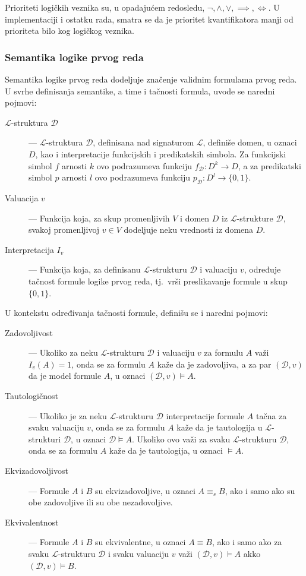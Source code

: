 \documentclass[a4paper,10pt]{article}
\begin{document}
Prioriteti logičkih veznika su, u opadajućem redosledu, $\lnot, \land, \lor, \implies, \iff$. U implementaciji i ostatku rada, smatra se da je prioritet kvantifikatora manji od prioriteta bilo kog logičkog veznika.

\subsubsection{Semantika logike prvog reda}

Semantika logike prvog reda dodeljuje značenje validnim formulama prvog reda. U svrhe definisanja semantike, a time i tačnosti formula, uvode se naredni pojmovi:

\begin{description}
    \item[$\mathcal{L}$-struktura $\mathcal{D}$] --- $\mathcal{L}$-struktura $\mathcal{D}$, definisana nad signaturom $\mathcal{L}$, definiše domen, u oznaci $D$, kao i interpretacije funkcijskih i predikatskih simbola. Za funkcijski simbol $f$ arnosti $k$ ovo podrazumeva funkciju $f_\mathcal{D}:D^k \rightarrow D$, a za predikatski simbol $p$ arnosti $l$ ovo podrazumeva funkciju $p_\mathcal{D}: D^l \rightarrow \{0, 1\}$.
    \item[Valuacija $v$] --- Funkcija koja, za skup promenljivih $V$ i domen $D$ iz $\mathcal{L}$-strukture $\mathcal{D}$, svakoj promenljivoj $v \in V$ dodeljuje neku vrednosti iz domena $D$.
    \item[Interpretacija $I_v$] --- Funkcija koja, za definisanu $\mathcal{L}$-strukturu $\mathcal{D}$ i valuaciju $v$, određuje tačnost formule logike prvog reda, tj.~vrši preslikavanje formule u skup $\{0, 1\}$.
\end{description}

U kontekstu određivanja tačnosti formule, definišu se i naredni pojmovi:
\begin{description}
    \item[Zadovoljivost] --- Ukoliko za neku $\mathcal{L}$-strukturu $\mathcal{D}$ i valuaciju $v$ za formulu $A$ važi $I_v(A) = 1$, onda se za formulu $A$ kaže da je zadovoljiva, a za par $(\mathcal{D}, v)$ da je model formule $A$, u oznaci $(\mathcal{D}, v) \vDash A$.
    \item[Tautologičnost] --- Ukoliko je za neku $\mathcal{L}$-strukturu $\mathcal{D}$ interpretacije formule $A$ tačna za svaku valuaciju $v$, onda se za formulu $A$ kaže da je tautologija u $\mathcal{L}$-strukturi $\mathcal{D}$, u oznaci $\mathcal{D} \vDash A$. Ukoliko ovo važi za svaku $\mathcal{L}$-strukturu $\mathcal{D}$, onda se za formulu $A$ kaže da je tautologija, u oznaci $\vDash A$.
    \item[Ekvizadovoljivost] --- Formule $A$ i $B$ su ekvizadovoljive, u oznaci $A \equiv_s B$, ako i samo ako su obe zadovoljive ili su obe nezadovoljive.
    \item[Ekvivalentnost] --- Formule $A$ i $B$ su ekvivalentne, u oznaci $A \equiv B$, ako i samo ako za svaku $\mathcal{L}$-strukturu $\mathcal{D}$ i svaku valuaciju $v$ važi $(\mathcal{D}, v) \vDash A$ akko $(\mathcal{D}, v) \vDash B$.
\end{description}
\end{document}
